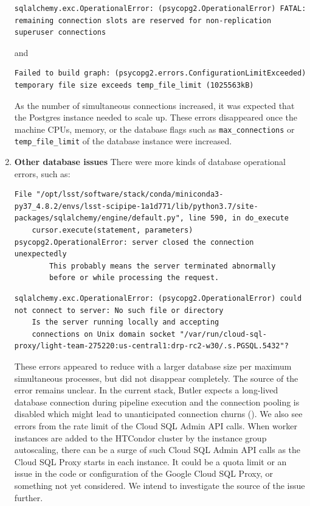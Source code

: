 \begin{enumerate}
\begin{lstlisting}[style=basherror]
sqlalchemy.exc.OperationalError: (psycopg2.OperationalError) FATAL:  remaining connection slots are reserved for non-replication superuser connections
\end{lstlisting}

and

\begin{lstlisting}[style=basherror]
Failed to build graph: (psycopg2.errors.ConfigurationLimitExceeded) temporary file size exceeds temp_file_limit (1025563kB)
\end{lstlisting}

As the number of simultaneous connections increased, it was expected that the Postgres instance needed to scale up.
These errors disappeared once the machine CPUs, memory, or the database flags such as \texttt{max\_connections} or \texttt{temp\_file\_limit} of the database instance were increased.

\item  \textbf{Other database issues}
There were more kinds of database operational errors, such as:

\begin{lstlisting}[style=basherror]
  File "/opt/lsst/software/stack/conda/miniconda3-py37_4.8.2/envs/lsst-scipipe-1a1d771/lib/python3.7/site-packages/sqlalchemy/engine/default.py", line 590, in do_execute
    cursor.execute(statement, parameters)
psycopg2.OperationalError: server closed the connection unexpectedly
        This probably means the server terminated abnormally
        before or while processing the request.
\end{lstlisting}

\begin{lstlisting}[style=basherror]
sqlalchemy.exc.OperationalError: (psycopg2.OperationalError) could not connect to server: No such file or directory
	Is the server running locally and accepting
	connections on Unix domain socket "/var/run/cloud-sql-proxy/light-team-275220:us-central1:drp-rc2-w30/.s.PGSQL.5432"?
\end{lstlisting}

These errors appeared to reduce with a larger database size per maximum simultaneous processes, but did not disappear completely.
The source of the error remains unclear.
In the current stack, Butler expects a long-lived database connection during pipeline execution and the connection pooling is disabled which might lead to unanticipated connection churns ().
We also see errors from the rate limit of the Cloud SQL Admin API calls.
When worker instances are added to the HTCondor cluster by the instance group autoscaling, there can be a surge of such Cloud SQL Admin API calls as the Cloud SQL Proxy starts in each instance.
It could be a quota limit or an issue in the code or configuration of the Google Cloud SQL Proxy, or something not yet considered.
We intend to investigate the source of the issue further.



\end{enumerate}
